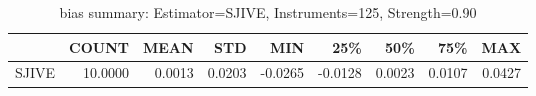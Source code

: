 \begin{table}[ht]
\centering
\caption{bias summary: Estimator=SJIVE, Instruments=125, Strength=0.90}
\begin{tabular}{lrrrrrrrr}
\toprule
 & COUNT & MEAN & STD & MIN & 25\% & 50\% & 75\% & MAX \\
\midrule
SJIVE & 10.0000 & 0.0013 & 0.0203 & -0.0265 & -0.0128 & 0.0023 & 0.0107 & 0.0427 \\
\bottomrule
\end{tabular}
\end{table}
